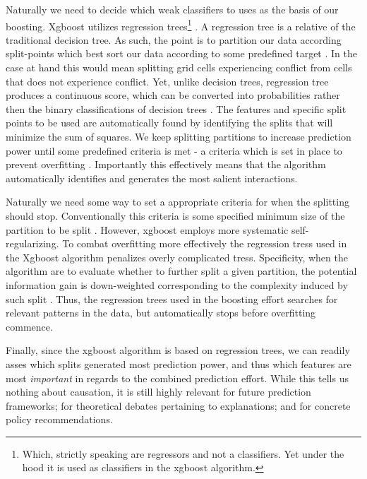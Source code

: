 \documentclass[a4paper]{article}
\begin{document}
Naturally we need to decide which weak classifiers to uses as the basis of our boosting. Xgboost utilizes regression trees\footnote{Which, strictly speaking are regressors and not a classifiers. Yet under the hood it is used as classifiers in the xgboost algorithm.} \citep[2]{Chen_2016}. A regression tree is a relative of the traditional decision tree. As such, the point is to partition our data according split-points which best sort our data according to some predefined target \citep[307]{Friedman_2001}. In the case at hand this would mean splitting grid cells experiencing conflict from cells that does not experience conflict. Yet, unlike decision trees, regression tree produces a continuous score, which can be converted into probabilities rather then the binary classifications of decision trees \citep[2]{Chen_2016}. The features and specific split points to be used are automatically found by identifying the splits that will minimize the sum of squares. We keep splitting partitions to increase prediction power until some predefined criteria is met - a criteria which is set in place to prevent overfitting \citep[307-308]{Friedman_2001}. Importantly this effectively means that the algorithm automatically identifies and generates the most salient interactions.\par

Naturally we need some way to set a appropriate criteria for when the splitting should stop. Conventionally this criteria is some specified minimum size of the partition to be split \citep[308]{Friedman_2001}. However, xgboost employs more systematic self-regularizing. To combat overfitting more effectively the regression tress used in the Xgboost algorithm penalizes overly complicated tress. Specificity, when the algorithm are to evaluate whether to further split a given partition, the potential information gain is down-weighted corresponding to the complexity induced by such split \cite[4-7]{Chen_2016}. Thus, the regression trees used in the boosting effort searches for relevant patterns in the data, but automatically stops before overfitting commence.\par

Finally, since the xgboost algorithm is based on regression trees, we can readily asses which splits generated most prediction power, and thus which features are most \emph{important} in regards to the combined prediction effort. While this tells us nothing about causation, it is still highly relevant for future prediction frameworks; for theoretical debates pertaining to explanations; and for concrete policy recommendations.\par
\end{document}
